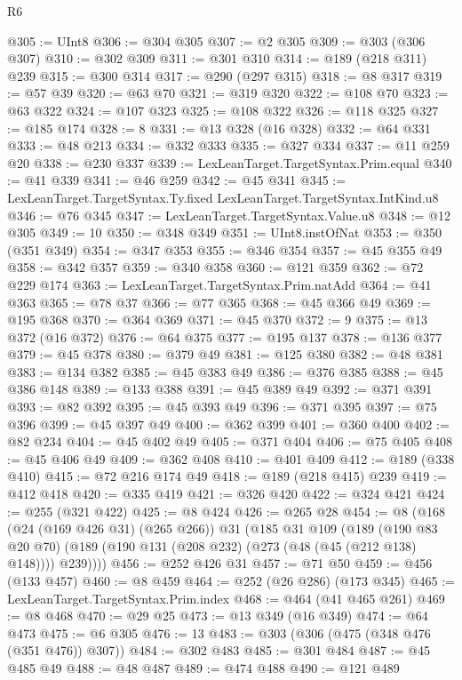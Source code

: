\begin{lexlean}{R6}
\begin{coremodule}
@305 := UInt8
@306 := @304 @305
@307 := @2 @305
@309 := @303 (@306 @307)
@310 := @302 @309
@311 := @301 @310
@314 := @189 (@218 @311) @239
@315 := @300 @314
@317 := @290 (@297 @315)
@318 := @8 @317
@319 := @57 @39
@320 := @63 @70
@321 := @319 @320
@322 := @108 @70
@323 := @63 @322
@324 := @107 @323
@325 := @108 @322
@326 := @118 @325
@327 := @185 @174
@328 := 8
@331 := @13 @328 (@16 @328)
@332 := @64 @331
@333 := @48 @213
@334 := @332 @333
@335 := @327 @334
@337 := @11 @259 @20
@338 := @230 @337
@339 := LexLeanTarget.TargetSyntax.Prim.equal
@340 := @41 @339
@341 := @46 @259
@342 := @45 @341
@345 := LexLeanTarget.TargetSyntax.Ty.fixed LexLeanTarget.TargetSyntax.IntKind.u8
@346 := @76 @345
@347 := LexLeanTarget.TargetSyntax.Value.u8
@348 := @12 @305
@349 := 10
@350 := @348 @349
@351 := UInt8.instOfNat
@353 := @350 (@351 @349)
@354 := @347 @353
@355 := @346 @354
@357 := @45 @355 @49
@358 := @342 @357
@359 := @340 @358
@360 := @121 @359
@362 := @72 @229 @174
@363 := LexLeanTarget.TargetSyntax.Prim.natAdd
@364 := @41 @363
@365 := @78 @37
@366 := @77 @365
@368 := @45 @366 @49
@369 := @195 @368
@370 := @364 @369
@371 := @45 @370
@372 := 9
@375 := @13 @372 (@16 @372)
@376 := @64 @375
@377 := @195 @137
@378 := @136 @377
@379 := @45 @378
@380 := @379 @49
@381 := @125 @380
@382 := @48 @381
@383 := @134 @382
@385 := @45 @383 @49
@386 := @376 @385
@388 := @45 @386 @148
@389 := @133 @388
@391 := @45 @389 @49
@392 := @371 @391
@393 := @82 @392
@395 := @45 @393 @49
@396 := @371 @395
@397 := @75 @396
@399 := @45 @397 @49
@400 := @362 @399
@401 := @360 @400
@402 := @82 @234
@404 := @45 @402 @49
@405 := @371 @404
@406 := @75 @405
@408 := @45 @406 @49
@409 := @362 @408
@410 := @401 @409
@412 := @189 (@338 @410)
@415 := @72 @216 @174 @49
@418 := @189 (@218 @415) @239
@419 := @412 @418
@420 := @335 @419
@421 := @326 @420
@422 := @324 @421
@424 := @255 (@321 @422)
@425 := @8 @424
@426 := @265 @28
@454 := @8
    (@168
      (@24 (@169 @426 @31) (@265 @266))
      @31
      (@185
        @31
        @109
        (@189
          (@190 @83 @20 @70)
          (@189 (@190 @131 (@208 @232) (@273 (@48 (@45 (@212 @138) @148)))) @239))))
@456 := @252 @426 @31
@457 := @71 @50
@459 := @456 (@133 @457)
@460 := @8 @459
@464 := @252 (@26 @286) (@173 @345)
@465 := LexLeanTarget.TargetSyntax.Prim.index
@468 := @464 (@41 @465 @261)
@469 := @8 @468
@470 := @29 @25
@473 := @13 @349 (@16 @349)
@474 := @64 @473
@475 := @6 @305
@476 := 13
@483 := @303 (@306 (@475 (@348 @476 (@351 @476)) @307))
@484 := @302 @483
@485 := @301 @484
@487 := @45 @485 @49
@488 := @48 @487
@489 := @474 @488
@490 := @121 @489

\end{coremodule}
\end{lexlean}
